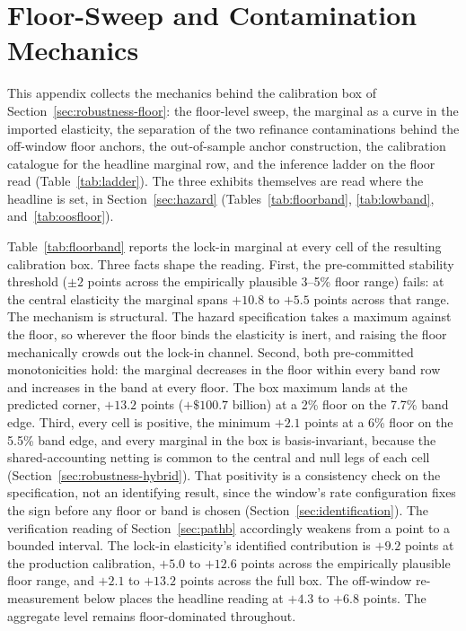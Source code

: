 \documentclass[12pt]{article}
\begin{document}
\nocite{cfpb_atr,frbny_soma,fred_actliscou,fred_wshomcb,fred_dspic96,fred_umcsent}

\section{Floor-Sweep and Contamination Mechanics}\label{app:floormech}

This appendix collects the mechanics behind the calibration box of Section~\ref{sec:robustness-floor}: the floor-level sweep, the marginal as a curve in the imported elasticity, the separation of the two refinance contaminations behind the off-window floor anchors, the out-of-sample anchor construction, the calibration catalogue for the headline marginal row, and the inference ladder on the floor read (Table~\ref{tab:ladder}). The three exhibits themselves are read where the headline is set, in Section~\ref{sec:hazard} (Tables~\ref{tab:floorband}, \ref{tab:lowband}, and~\ref{tab:oosfloor}).

Table~\ref{tab:floorband} reports the lock-in marginal at every cell of the resulting calibration box. Three facts shape the reading. First, the pre-committed stability threshold ($\pm 2$ points across the empirically plausible 3--5\% floor range) fails: at the central elasticity the marginal spans $+10.8$ to $+5.5$ points across that range. The mechanism is structural. The hazard specification takes a maximum against the floor, so wherever the floor binds the elasticity is inert, and raising the floor mechanically crowds out the lock-in channel. Second, both pre-committed monotonicities hold: the marginal decreases in the floor within every band row and increases in the band at every floor. The box maximum lands at the predicted corner, $+13.2$ points ($+\$100.7$ billion) at a 2\% floor on the 7.7\% band edge. Third, every cell is positive, the minimum $+2.1$ points at a 6\% floor on the 5.5\% band edge, and every marginal in the box is basis-invariant, because the shared-accounting netting is common to the central and null legs of each cell (Section~\ref{sec:robustness-hybrid}). That positivity is a consistency check on the specification, not an identifying result, since the window's rate configuration fixes the sign before any floor or band is chosen (Section~\ref{sec:identification}). The verification reading of Section~\ref{sec:pathb} accordingly weakens from a point to a bounded interval. The lock-in elasticity's identified contribution is $+9.2$ points at the production calibration, $+5.0$ to $+12.6$ points across the empirically plausible floor range, and $+2.1$ to $+13.2$ points across the full box. The off-window re-measurement below places the headline reading at $+4.3$ to $+6.8$ points. The aggregate level remains floor-dominated throughout.
\end{document}

